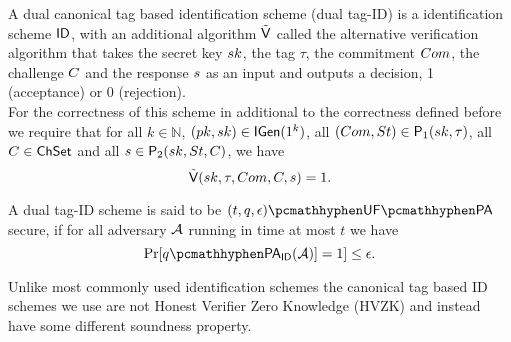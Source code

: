 \begin{definition}
A dual canonical tag based identification scheme (dual tag-ID) is a identification scheme $\mathsf{ID}$, with an additional algorithm $\tilde{\mathsf{V}}$ called the alternative verification algorithm that takes the secret key $sk$, the tag $\tau$, the commitment $Com$, the challenge $C$ and the response $s$ as an input and outputs a decision, 1 (acceptance) or 0 (rejection).
\\
For the correctness of this scheme in additional to the correctness defined before we require that for all $k \in \mathbb{N}$,
$(pk,sk) \in \mathsf{IGen}(1^k)$,
all
$(Com,St) \in \mathsf{P}_1(sk, \tau)$,
all $C \in \mathsf{ChSet}$ and all 
$s \in \mathsf{P}_2(sk,St,C)$,
we have
$$ \tilde{\mathsf{V}}(sk,\tau,Com,C,s) = 1.$$
\end{definition}

\begin{definition}
A dual tag-ID scheme is said to be $(t,q,\epsilon)\hyph \ufpa$ secure, if for all adversary $\mathcal{A}$ running in time at most $t$ we have
$$\Pr[q\hyph\xsoundness_{\ID}(\adv)]=1] \leq \epsilon.$$
\end{definition}

Unlike most commonly used identification schemes the canonical tag based ID schemes we use are not Honest Verifier Zero Knowledge (HVZK) and instead have some different soundness property.

\begin{figure}[htb!]
    \centering
    \nicoresetlinenr
    \caption{}
    \label{fig:x-soundess}
\end{figure}




